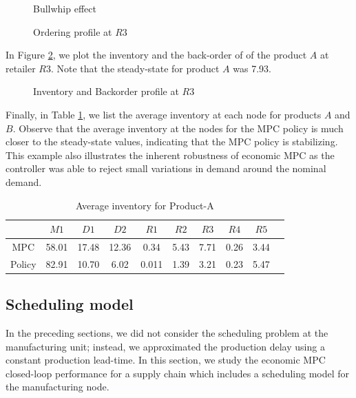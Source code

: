 \begin{figure}
\centering
\scriptsize
\resizebox{1\textwidth}{!}{}
\caption{Bullwhip effect}
\label{fig:esc:bullwhip}
\centering
\scriptsize
\resizebox{1\textwidth}{!}{}
\caption{Ordering profile at $R3$}
\label{fig:esc:Order}
\end{figure}



In Figure \ref{fig:esc:R3}, we plot the inventory and the
back-order of  of the product $A$
at retailer $R3$. Note that the steady-state for product $A$ was
7.93. 

\begin{figure}[h]
\centering
\scriptsize
\resizebox{1\textwidth}{!}{}
\caption{Inventory and Backorder profile at $R3$}
\label{fig:esc:R3}
\end{figure}

Finally, in Table \ref{tab:esc:avgA}, we list the
average inventory at each node for products $A$ and $B$. Observe that
the average inventory at the nodes for the MPC policy is much closer
to the steady-state values, indicating that the MPC policy is
stabilizing. This example also illustrates the inherent robustness of
economic MPC as the controller was able to reject small variations in
demand around the nominal demand.

\begin{table}[h]
\caption{Average inventory for Product-A}
\label{tab:esc:avgA}
\begin{center}
\begin{tabular}{cccccccccc}\toprule
 &$M1$&$D1$&$D2$&$R1$&$R2$&$R3$&$R4$&$R5$\\ \midrule
MPC&58.01&17.48&12.36&0.34&5.43&7.71&0.26&3.44\\ 
Policy&82.91&10.70&6.02&0.011&1.39&3.21&0.23&5.47\\
\bottomrule 
\end{tabular}
\end{center}
\end{table}
\subsection{Scheduling model}
\label{sec:esc:multi:scheduling}
In the preceding sections, we did not consider the scheduling problem
at the manufacturing unit; instead, we approximated the production
delay using a constant production lead-time. In this section, we study
the economic MPC closed-loop performance for a supply chain which
includes a scheduling model for the manufacturing node.

